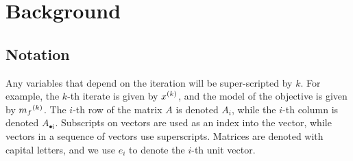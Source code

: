   
% 
% 
% 
% 
% 
% 
% 


\section{Background}

\subsection{Notation}

Any variables that depend on the iteration will be super-scripted by $k$.
For example, the $k$-th iterate is given by ${x^{(k)}}$, and the model of the objective is given by ${{m}_f}^{(k)}$.
The $i$-th row of the matrix $A$ is denoted $A_i$, while the $i$-th column is denoted $A_{\bullet i}$.
Subscripts on vectors are used as an index into the vector, while vectors in a sequence of vectors use superscripts.
Matrices are denoted with capital letters, and we use $e_i$ to denote the $i$-th unit vector.                     %

